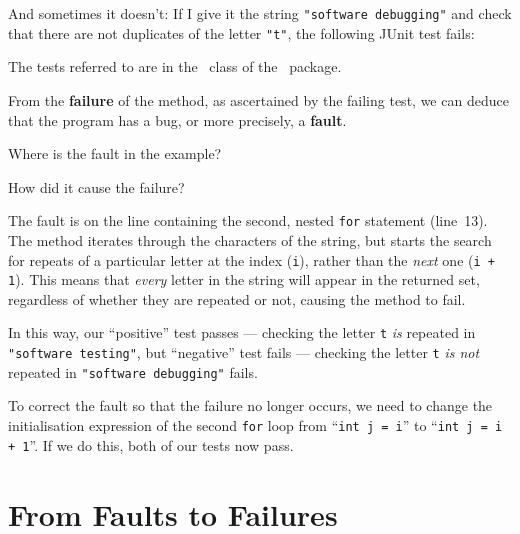 \newpage
And sometimes it doesn't: If I give it the string {\tt "software debugging"} and
check that there are not duplicates of the letter {\tt "t"}, the following JUnit
test fails:

\begin{center} 
\end{center} 

The tests referred to are in the \teststringutilsbuggyoneclass~class of the
\examplespackage~package.

From the {\bf failure} of the method, as ascertained by the failing test, we can
deduce that the program has a bug, or more precisely, a {\bf fault}.


Where is the fault in the example?

How did it cause the failure?


The fault is on the line containing the second, nested {\tt for} statement
(line~13). The method iterates through the characters of the string, but starts
the search for repeats of a particular letter at the {\it } index ({\tt i}),
rather than the {\it next} one ({\tt i + 1}). This means that {\it every} letter
in the string will appear in the returned set, regardless of whether they are
repeated or not, causing the method to fail. 

In this way, our ``positive'' test passes --- checking the letter {\tt t} {\it
is} repeated in {\tt "software testing"}, but ``negative'' test fails ---
checking the letter {\tt t} {\it is not} repeated in {\tt "software debugging"}
fails.

To correct the fault so that the failure no longer occurs, we need to change the
initialisation expression of the second {\tt for} loop from ``{\tt int j = i}''
to ``{\tt int j = i + 1}''. If we do this, both of our tests now pass.



\section{From Faults to Failures}

